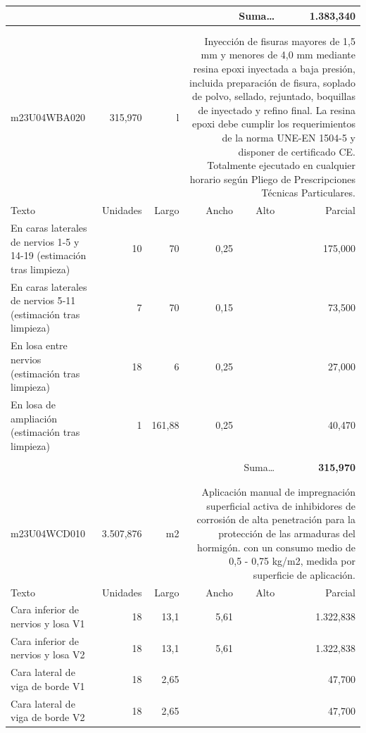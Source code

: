 \documentclass{book}%
\begin{document}
\begin{longtable}{lrrrrr}
\multicolumn{5}{r}{Suma\ldots}&\textbf{ 1.383,340}\\%
\hline%
&&&&&\\%
&&&&&\\%
m23U04WBA020&   315,970& l&\multicolumn{3}{p{6cm}}{\scriptsize Inyección de fisuras mayores de 1,5 mm y menores de 4,0 mm mediante resina epoxi inyectada a baja presión, incluida preparación de fisura, soplado de polvo, sellado, rejuntado, boquillas de inyectado y refino final. La resina epoxi debe cumplir los requerimientos de la norma UNE-EN 1504-5 y disponer de certificado CE. Totalmente ejecutado en cualquier horario según Pliego de Prescripciones Técnicas Particulares.\normalsize}\\%
Texto&Unidades&Largo&Ancho&Alto&Parcial\\%
\hline%
\multicolumn{1}{p{3.5cm}}{En caras laterales de nervios 1{-}5 y 14{-}19 (estimación tras limpieza)}&10&70&0,25&&   175,000\\%
\multicolumn{1}{p{3.5cm}}{En caras laterales de nervios 5{-}11 (estimación tras limpieza)}&7&70&0,15&&    73,500\\%
\multicolumn{1}{p{3.5cm}}{En losa entre nervios (estimación tras limpieza)}&18&6&0,25&&    27,000\\%
\multicolumn{1}{p{3.5cm}}{En losa de ampliación (estimación tras limpieza)}&1&161,88&0,25&&    40,470\\%
&&&&&\\%
\multicolumn{5}{r}{Suma\ldots}&\textbf{   315,970}\\%
\hline%
&&&&&\\%
&&&&&\\%
m23U04WCD010& 3.507,876& m2&\multicolumn{3}{p{6cm}}{\scriptsize Aplicación manual de impregnación superficial activa de inhibidores de corrosión de alta penetración para la protección de las armaduras del hormigón. con un consumo medio de 0,5 - 0,75 kg/m2, medida por superficie de aplicación.\normalsize}\\%
Texto&Unidades&Largo&Ancho&Alto&Parcial\\%
\hline%
\multicolumn{1}{p{3.5cm}}{Cara inferior de nervios y losa V1}&18&13,1&5,61&& 1.322,838\\%
\multicolumn{1}{p{3.5cm}}{Cara inferior de nervios y losa V2}&18&13,1&5,61&& 1.322,838\\%
\multicolumn{1}{p{3.5cm}}{Cara lateral de viga de borde V1}&18&2,65&&&    47,700\\%
\multicolumn{1}{p{3.5cm}}{Cara lateral de viga de borde V2}&18&2,65&&&    47,700\\%

\end{longtable}
\end{document}
